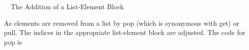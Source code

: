 \ \ The Addition of a List-Element Block


As elements are removed from a list by pop (which is synonymous with
get) or pull. The indices in the appropriate list-element block are
adjusted. The code for pop is

